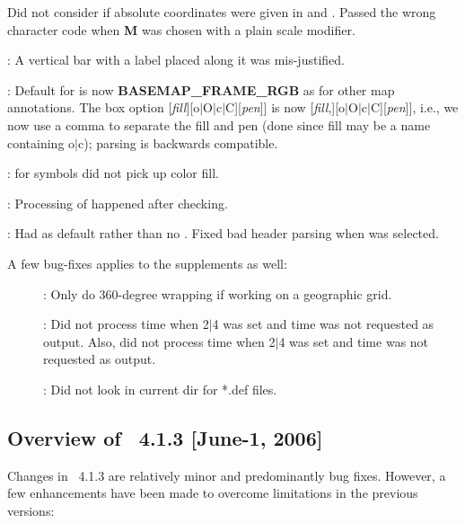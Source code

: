 \begin{description}
Did not consider if absolute coordinates were given in  and . Passed the wrong character code
when \textbf{M} was chosen with a plain scale modifier.
\item [\GMTprog{psscale}]: A vertical bar with a label placed along it was mis-justified.
\item [\GMTprog{pstext}]: Default for  is now \textbf{BASEMAP\_FRAME\_RGB} as for other map annotations.
The box option [\emph{fill}][o$|$O$|$c$|$C][\emph{pen}]] is now [\emph{fill},][o$|$O$|$c$|$C][\emph{pen}]], i.e., we now use
a comma to separate the fill and pen (done since fill may be a name containing o$|$c); parsing is backwards compatible.
\item [\GMTprog{psxyz}]:  for symbols did not pick up color fill.
\item [\GMTprog{trend2d}]: Processing of  happened after checking.
\item [\GMTprog{xyz2grd}]: Had  as default rather than no .  Fixed bad header parsing when  was selected.
\end{description}
A few bug-fixes applies to the supplements as well:
\begin{description}
\item []: Only do 360-degree wrapping if working on a geographic grid.
\item []: Did not process time when 2$|$4 was set and time was not requested as output.
Also, did not process time when 2$|$4 was set and time was not requested as output.
\item []: Did not look in current dir for *.def files.
\end{description}

\subsection{Overview of \gmt\ 4.1.3 [June-1, 2006]}

Changes in \GMT\ 4.1.3 are relatively minor and predominantly bug fixes.  However, a few enhancements
have been made to overcome limitations in the previous versions:

